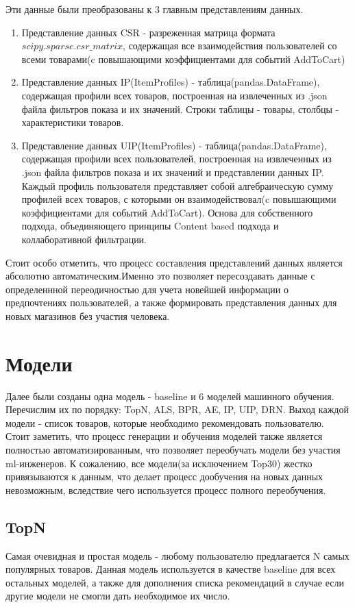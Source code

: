 \documentclass[14pt]{mmcs_article}
\newenvironment{myenumerate}
{ \begin{enumerate}
		\setlength{\itemsep}{0pt}
		\setlength{\parskip}{0pt}
		\setlength{\parsep}{0pt}     }
	{ \end{enumerate}                  }
\begin{document}
Эти данные были преобразованы к 3 главным представлениям данных. 
\begin{myenumerate}
	\item Представление данных CSR - разреженная матрица формата \\$scipy$.$sparse$.$csr\_matrix$, содержащая все взаимодействия пользователей со всеми товарами(c повышающими коэффициентами для событий AddToCart)
	\item Представление данных IP(ItemProfiles) - таблица(pandas.DataFrame), содержащая профили всех товаров, построенная на извлеченных из .json файла фильтров показа и их значений. Строки таблицы - товары, столбцы - характеристики товаров.
	\item Представление данных UIP(ItemProfiles) - таблица(pandas.DataFrame), содержащая профили всех пользователей, построенная на извлеченных из .json файла фильтров показа и их значений и представлении данных IP. Каждый профиль пользователя представляет собой алгебраическую сумму профилей всех товаров, с которыми он взаимодействовал(c повышающими коэффициентами для событий AddToCart). Основа для собственного подхода, объединяющего принципы Content based подхода и коллаборативной фильтрации.
\end{myenumerate}
Стоит особо отметить, что процесс составления представлений данных является абсолютно автоматическим.Именно это позволяет пересоздавать данные с определеннной переодичностью для учета новейшей информации о предпочтениях пользователей, а также формировать представления данных для новых магазинов без участия человека.


\section{Модели}\label{dsfs}
Далее были созданы одна модель - baseline и 6 моделей машинного обучения. Перечислим их по порядку: TopN, ALS, BPR, AE, IP, UIP, DRN. Выход каждой модели - список товаров, которые необходимо рекомендовать пользователю. \\
Стоит заметить, что процесс генерации и обучения моделей также является полностью автоматизированным, что позволяет переобучать модели без участия ml-инженеров. К сожалению, все модели(за исключением Top30) жестко привязываются к данным, что делает процесс дообучения на новых данных невозможным, вследствие чего используется процесс полного переобучения.
\subsection{TopN}
Самая очевидная и простая модель - любому пользователю предлагается N самых популярных товаров. Данная модель используется в качестве baseline для всех остальных моделей, а также для дополнения списка рекомендаций в случае если другие модели не смогли дать необходимое их число.
\end{document}

